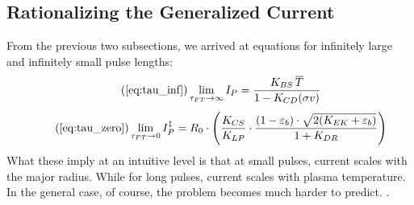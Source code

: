 \subsection{Rationalizing the Generalized Current}

From the previous two subsections, we arrived at equations for infinitely large and infinitely small pulse lengths:
\begin{equation}
	\tag{\ref{eq:tau_inf}}
	\lim_{\tau_{FT} \to \infty} I_P = \frac{ K_{BS} \, \overline T }{ 1 - K_{CD} ( \sigma v ) }
\end{equation}
\begin{equation}
	\tag{\ref{eq:tau_zero}}
	\lim_{ \tau_{FT} \to 0 } I_P^\ddagger = R_0 \cdot \left( \frac{ K_{CS} }{ K_{LP} } \cdot \frac{ ( 1 - \varepsilon_b ) \cdot \sqrt{ 2 ( K_{EK} + \varepsilon_b ) } }{ 1 + K_{DR} } \right)
\end{equation}
What these imply at an intuitive level is that at small pulses, current scales with the major radius. While for long pulses, current scales with plasma temperature. In the general case, of course, the problem becomes much harder to predict. .

%
